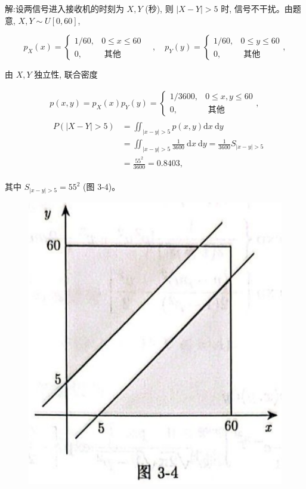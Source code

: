 \documentclass{beamer}
\begin{document}
	\begin{frame}
		解:设两信号进入接收机的时刻为 $X, Y$ (秒), 则 $|X-Y|>5$ 时, 信号不干扰。由题 意, $X, Y \sim U[0,60]$,
		
		$$
		p_{X}(x)=\left\{\begin{array}{cc}
			1 / 60, & 0 \leqslant x \leqslant 60 \\
			0, & \text { 其他 }
		\end{array} \quad, \quad p_{Y}(y)=\left\{\begin{array}{cc}
			1 / 60, & 0 \leqslant y \leqslant 60 \\
			0, & \text { 其他 }
		\end{array},\right.\right.
		$$
		
		由 $X, Y$ 独立性, 联合密度
		
		$$
		\begin{aligned}
			& p(x, y)=p_{X}(x) p_{Y}(y)=\left\{\begin{array}{cc}
				1 / 3600, & 0 \leqslant x, y \leqslant 60 \\
				0, & \text { 其他 }
			\end{array},\right. \\
			& \begin{aligned}
				P(|X-Y|>5) & =\iint_{|x-y|>5} p(x, y) \mathrm{d} x \mathrm{~d} y \\
				& =\iint_{|x-y|>5} \frac{1}{3600} \mathrm{~d} x \mathrm{~d} y=\frac{1}{3600} S_{|x-y|>5} \\
				& =\frac{55^{2}}{3600}=0.8403,
			\end{aligned}
		\end{aligned}
		$$
		
		其中 $S_{|x-y|>5}=55^{2}$ (图 3-4)。
	\end{frame}
	
	\begin{frame}
		\begin{figure}
			\centering
			\includegraphics[scale = 0.3]{figures/figure3-4.png}
		\end{figure}
	\end{frame}
	
\end{document}
